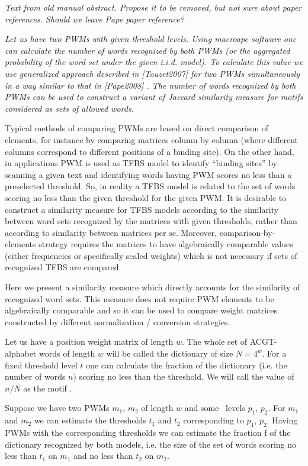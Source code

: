 \emph{Text from old manual abstract. Propose it to be removed, but not sure about paper references. Should we leave Pape paper reference?}

\emph{Let us have two PWMs with given threshold levels. Using macroape software one can 
calculate the number of words recognized by both PWMs (or the aggregated probability of the 
word set under the given i.i.d. model). To calculate this value we use generalized approach 
described in [Touzet2007] for two PWMs simultaneously in a way similar to that in [Pape2008]
. The number of words recognized by both PWMs can be used to construct a variant of Jaccard 
similarity measure for motifs considered as sets of allowed words.}

Typical methods of comparing PWMs are based on direct comparison of elements, for instance 
by comparing matrices column by column (where different columns correspond to different 
positions of a binding site). On the other hand, in applications PWM is used as TFBS model 
to identify “binding sites” by scanning a given text and identifying words having PWM scores 
no less than a preselected threshold. So, in reality a TFBS model is related to the set of words 
scoring no less than the given threshold for the given PWM. It is desirable to construct a 
similarity measure for TFBS models according to the similarity between word sets recognized 
by the matrices with given thresholds, rather than according to similarity between matrices per 
se. Moreover, comparison-by-elements strategy requires the matrices to have algebraically 
comparable values (either frequencies or specifically scaled weights) which is not necessary if 
sets of recognized TFBS are compared.

Here we present a similarity measure which directly accounts for the similarity of 
recognized word sets. This measure does not require PWM elements to be algebraically 
comparable and so it can be used to compare weight matrices constructed by different 
normalization / conversion strategies.

Let us have a position weight matrix of length $w$. The whole set of ACGT-alphabet 
words of length $w$ will be called the dictionary of size $N=4^w$. For a fixed threshold level $t$ one 
can calculate the fraction of the dictionary (i.e. the number of words $n$) scoring no less than the 
threshold. We will call the value of $n / N$ as the motif \pvalue.

Suppose we have two PWMs $m_1$, $m_2$ of length $w$ and some \pvalue\ levels $p_1$, $p_2$. For $m_1$
and $m_2$ we can estimate the thresholds $t_1$ and $t_2$ corresponding to $p_1$, $p_2$. Having PWMs with the 
corresponding thresholds we can estimate the fraction f of the dictionary recognized by both 
models, i.e. the size of the set of words scoring no less than $t_1$ on $m_1$ and no less than $t_2$ on $m_2$.

